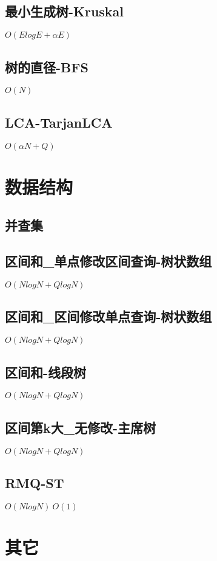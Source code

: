 \documentclass[10pt]{article}
\begin{document}
\subsection{最小生成树-Kruskal}
$O(ElogE+αE)$


\subsection{树的直径-BFS}
$O(N)$


\subsection{LCA-TarjanLCA}
$O(αN+Q)$

\section{数据结构}
\subsection{并查集}


\subsection{区间和\_单点修改区间查询-树状数组}
$O(NlogN+QlogN)$


\subsection{区间和\_区间修改单点查询-树状数组}
$O(NlogN+QlogN)$


\subsection{区间和-线段树}
$O(NlogN+QlogN)$


\subsection{区间第k大\_无修改-主席树}
$O(NlogN+QlogN)$


\subsection{RMQ-ST}
$O(NlogN)~O(1)$

\section{其它}
\end{document}
